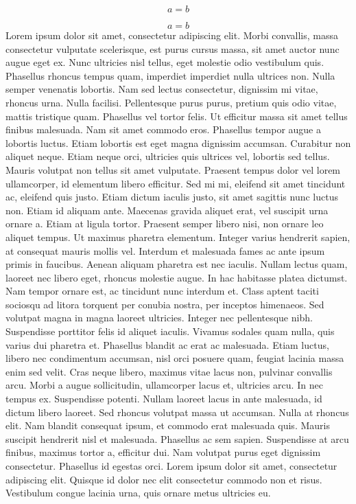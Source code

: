 \documentclass[oneside,a4paper,DIV=calc,BCOR=10mm, parskip=false]{scrreprt}
\begin{document}
\begin{equation}
a=b
\end{equation}

\begin{equation*}
a=b
\end{equation*}
Lorem ipsum dolor sit amet, consectetur adipiscing elit. Morbi convallis, massa consectetur vulputate scelerisque, est purus cursus massa, sit amet auctor nunc augue eget ex. Nunc ultricies nisl tellus, eget molestie odio vestibulum quis. Phasellus rhoncus tempus quam, imperdiet imperdiet nulla ultrices non. Nulla semper venenatis lobortis. Nam sed lectus consectetur, dignissim mi vitae, rhoncus urna. Nulla facilisi. Pellentesque purus purus, pretium quis odio vitae, mattis tristique quam. Phasellus vel tortor felis. Ut efficitur massa sit amet tellus finibus malesuada. Nam sit amet commodo eros. Phasellus tempor augue a lobortis luctus. Etiam lobortis est eget magna dignissim accumsan. Curabitur non aliquet neque. Etiam neque orci, ultricies quis ultrices vel, lobortis sed tellus. Mauris volutpat non tellus sit amet vulputate. Praesent tempus dolor vel lorem ullamcorper, id elementum libero efficitur.
Sed mi mi, eleifend sit amet tincidunt ac, eleifend quis justo. Etiam dictum iaculis justo, sit amet sagittis nunc luctus non. Etiam id aliquam ante. Maecenas gravida aliquet erat, vel suscipit urna ornare a. Etiam at ligula tortor. Praesent semper libero nisi, non ornare leo aliquet tempus. Ut maximus pharetra elementum. Integer varius hendrerit sapien, at consequat mauris mollis vel. Interdum et malesuada fames ac ante ipsum primis in faucibus. Aenean aliquam pharetra est nec iaculis. Nullam lectus quam, laoreet nec libero eget, rhoncus molestie augue.
In hac habitasse platea dictumst. Nam tempor ornare est, ac tincidunt nunc interdum et. Class aptent taciti sociosqu ad litora torquent per conubia nostra, per inceptos himenaeos. Sed volutpat magna in magna laoreet ultricies. Integer nec pellentesque nibh. Suspendisse porttitor felis id aliquet iaculis. Vivamus sodales quam nulla, quis varius dui pharetra et. Phasellus blandit ac erat ac malesuada. Etiam luctus, libero nec condimentum accumsan, nisl orci posuere quam, feugiat lacinia massa enim sed velit.
Cras neque libero, maximus vitae lacus non, pulvinar convallis arcu. Morbi a augue sollicitudin, ullamcorper lacus et, ultricies arcu. In nec tempus ex. Suspendisse potenti. Nullam laoreet lacus in ante malesuada, id dictum libero laoreet. Sed rhoncus volutpat massa ut accumsan. Nulla at rhoncus elit. Nam blandit consequat ipsum, et commodo erat malesuada quis. Mauris suscipit hendrerit nisl et malesuada. Phasellus ac sem sapien. Suspendisse at arcu finibus, maximus tortor a, efficitur dui. Nam volutpat purus eget dignissim consectetur. Phasellus id egestas orci. Lorem ipsum dolor sit amet, consectetur adipiscing elit. Quisque id dolor nec elit consectetur commodo non et risus. Vestibulum congue lacinia urna, quis ornare metus ultricies eu.
\end{document}

